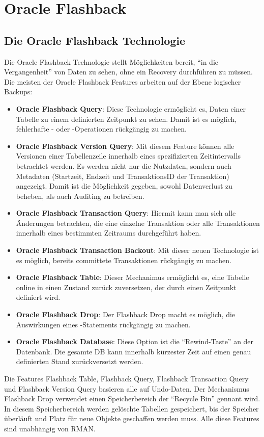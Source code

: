 \chapter{Oracle Flashback}
\chaptertoc{}
\cleardoubleevenpage

    \section{Die Oracle Flashback Technologie}
      Die Oracle Flashback Technologie stellt Möglichkeiten bereit,
      \enquote{in die Vergangenheit} von Daten zu sehen, ohne ein Recovery
      durchführen zu müssen. Die meisten der Oracle Flash\-back Features
      arbeiten auf der Ebene logischer Backups:
      \begin{itemize}
        \item \textbf{Oracle Flashback Query}: Diese Technologie ermöglicht es, Daten einer Tabelle zu einem definierten Zeitpunkt zu sehen. Damit ist es möglich, fehlerhafte - oder -Operationen rückgängig zu machen.
        \item \textbf{Oracle Flashback Version Query}: Mit diesem Feature können alle Versionen einer Tabellenzeile innerhalb eines spezifizierten Zeitintervalls betrachtet werden. Es werden nicht nur die Nutzdaten, sondern auch Metadaten (Startzeit, Endzeit und TransaktionsID der Transaktion) angezeigt. Damit ist die Möglichkeit gegeben, sowohl Datenverlust zu beheben, als auch Auditing zu betreiben.
        \item \textbf{Oracle Flashback Transaction Query}: Hiermit kann man sich alle Änderungen betrachten, die eine einzelne Transaktion oder alle Transaktionen innerhalb eines bestimmten Zeitraums durchgeführt haben.
        \item \textbf{Oracle Flashback Transaction Backout}: Mit dieser neuen Technologie ist es möglich, bereits committete Transaktionen rückgängig zu machen.
        \item \textbf{Oracle Flashback Table}: Dieser Mechanimus ermöglicht es, eine Tabelle online in einen Zustand zurück zuversetzen, der durch einen Zeitpunkt definiert wird.
        \item \textbf{Oracle Flashback Drop}: Der Flashback Drop macht es möglich, die Auswirkungen eines -Statements rückgängig zu machen.
        \item \textbf{Oracle Flashback Database}: Diese Option ist die \enquote{Rewind-Taste} an der Datenbank. Die gesamte DB kann innerhalb kürzester Zeit auf einen genau definierten Stand zurückversetzt werden.
      \end{itemize}
      Die Features Flashback Table, Flashback Query, Flashback Transaction Query und Flash\-back Version Query basieren alle auf Undo-Daten. Der Mechanismus Flashback Drop verwendet einen Speicherbereich der \enquote{Recycle Bin} gennant wird. In diesem Speicherbereich werden gelöschte Tabellen gespeichert, bis der Speicher überläuft und Platz für neue Objekte geschaffen werden muss. Alle diese Features sind unabhängig von RMAN.

